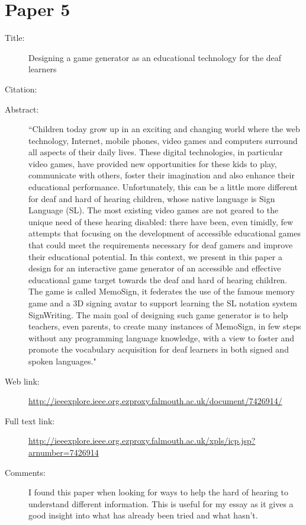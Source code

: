 \documentclass{scrartcl}
\begin{document}
\section*{Paper 5}
\begin{description}
\item[Title:] Designing a game generator as an educational technology for the deaf learners
\item[Citation:] \cite{Bouzid}
\item[Abstract:] ``Children today grow up in an exciting and changing world where the web technology, Internet, mobile phones, video games and computers surround all aspects of their daily lives. These digital technologies, in particular video games, have provided new opportunities for these kids to play, communicate with others, foster their imagination and also enhance their educational performance. Unfortunately, this can be a little more different for deaf and hard of hearing children, whose native language is Sign Language (SL). The most existing video games are not geared to the unique need of these hearing disabled: there have been, even timidly, few attempts that focusing on the development of accessible educational games that could meet the requirements necessary for deaf gamers and improve their educational potential. In this context, we present in this paper a design for an interactive game generator of an accessible and effective educational game target towards the deaf and hard of hearing children. The game is called MemoSign, it federates the use of the famous memory game and a 3D signing avatar to support learning the SL notation system SignWriting. The main goal of designing such game generator is to help teachers, even parents, to create many instances of MemoSign, in few steps without any programming language knowledge, with a view to foster and promote the vocabulary acquisition for deaf learners in both signed and spoken languages."
\item[Web link:]  \url{http://ieeexplore.ieee.org.ezproxy.falmouth.ac.uk/document/7426914/}
\item[Full text link:] \url{http://ieeexplore.ieee.org.ezproxy.falmouth.ac.uk/xpls/icp.jsp?arnumber=7426914}
\item[Comments:] I found this paper when looking for ways to help the hard of hearing to understand different information. This is useful for my essay as it gives a good insight into what has already been tried and what hasn't.
\end{description}
\end{document}
